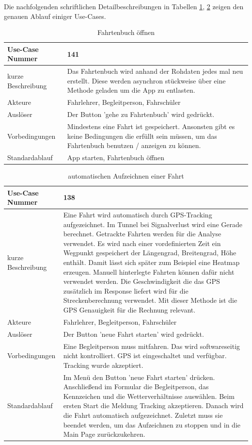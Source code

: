 Die nachfolgenden schriftlichen Detailbeschreibungen in Tabellen \ref{tab:USE-Case1}, \ref{tab:USE-Case2} zeigen den genauen Ablauf einiger Use-Cases.
\begin{table}[H]
	\centering
	\begin{tabularx}{\textwidth}{|l|X|}
		\hline
		Use-Case Nummer & 141 \\
		\hline
		kurze Beschreibung & Das Fahrtenbuch wird anhand der Rohdaten jedes mal neu erstellt. Diese werden asynchron stückweise über eine Methode geladen um die App zu entlasten.   \\
		\hline
		Akteure &  Fahrlehrer, Begleitperson, Fahrschüler\\
		\hline
		Auslöser & Der Button 'gehe zu Fahrtenbuch' wird gedrückt. \\
		\hline
		Vorbedingungen & Mindestens eine Fahrt ist gespeichert. Ansonsten gibt es keine Bedingungen die erfüllt sein müssen, um das Fahrtenbuch benutzen / anzeigen zu können. \\
		\hline
		Standardablauf & App starten, Fahrtenbuch öffnen \\
		\hline
	\end{tabularx}
	\caption{Fahrtenbuch öffnen}
	\label{tab:USE-Case1}
\end{table}

\begin{table}[H]
	\centering
	\begin{tabularx}{\textwidth}{|l|X|}
		\hline
		Use-Case Nummer & 138 \\
		\hline
		kurze Beschreibung & Eine Fahrt wird automatisch durch GPS-Tracking aufgezeichnet. Im Tunnel bei Signalverlust wird eine Gerade berechnet. Getrackte Fahrten werden für die Analyse verwendet. Es wird nach einer vordefinierten Zeit ein Wegpunkt gespeichert der Längengrad, Breitengrad, Höhe enthält. Damit lässt sich später zum Beispiel eine Heatmap erzeugen. Manuell hinterlegte Fahrten können dafür nicht verwendet werden. Die Geschwindigkeit die das GPS zusätzlich im Response liefert wird für die Streckenberechnung verwendet. Mit dieser Methode ist die GPS Genauigkeit für die Rechnung relevant.    \\
		\hline
		Akteure &  Fahrlehrer, Begleitperson, Fahrschüler\\
		\hline
		Auslöser & Der Button 'neue Fahrt starten' wird gedrückt. \\
		\hline
		Vorbedingungen & Eine Begleitperson muss mitfahren. Das wird softwareseitig nicht kontrolliert. GPS ist eingeschaltet und verfügbar. Tracking wurde akzeptiert. \\
		\hline
		Standardablauf & Im Menü den Button 'neue Fahrt starten' drücken. Anschließend im Formular die Begleitperson, das Kennzeichen und die Wetterverhältnisse auswählen. Beim ersten Start die Meldung Tracking akzeptieren. Danach wird die Fahrt automatisch aufgezeichnet. Zuletzt muss sie beendet werden, um das Aufzeichnen zu stoppen und in die Main Page zurückzukehren. \\
		\hline
	\end{tabularx}
	\caption{automatischen Aufzeichnen einer Fahrt}
	\label{tab:USE-Case2}
\end{table}


